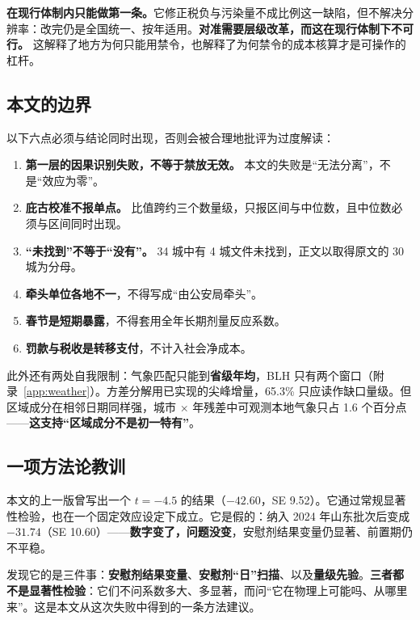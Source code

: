 \textbf{在现行体制内只能做第一条。}它修正税负与污染量不成比例这一缺陷，但不解决分辨率：改完仍是全国统一、按年适用。\textbf{对准需要层级改革，而这在现行体制下不可行。} 这解释了地方为何只能用禁令，也解释了为何禁令的成本核算才是可操作的杠杆。

\subsection{本文的边界}\label{sec:limits}

以下六点必须与结论同时出现，否则会被合理地批评为过度解读：

\begin{enumerate}
  \item \textbf{第一层的因果识别失败，不等于禁放无效。} 本文的失败是“无法分离”，不是“效应为零”。
  \item \textbf{庇古校准不报单点。} 比值跨约三个数量级，只报区间与中位数，且中位数必须与区间同时出现。
  \item \textbf{“未找到”不等于“没有”。} 34 城中有 4 城文件未找到，正文以取得原文的 30 城为分母。
  \item \textbf{牵头单位各地不一}，不得写成“由公安局牵头”。
  \item \textbf{春节是短期暴露}，不得套用全年长期剂量反应系数。
  \item \textbf{罚款与税收是转移支付}，不计入社会净成本。
\end{enumerate}

此外还有两处自我限制：气象匹配只能到\textbf{省级年均}，BLH 只有两个窗口（附录~\ref{app:weather}）。方差分解用已实现的尖峰增量，65.3\% 只应读作缺口量级。但区域成分在相邻日期同样强，城市 $\times$ 年残差中可观测本地气象只占 1.6 个百分点——\textbf{这支持“区域成分不是初一特有”}。

\subsection{一项方法论教训}

本文的上一版曾写出一个 $t=-4.5$ 的结果（$-42.60$，SE 9.52）。它通过常规显著性检验，也在一个固定效应设定下成立。它是假的：纳入 2024 年山东批次后变成 $-31.74$（SE 10.60）——\textbf{数字变了，问题没变}，安慰剂结果变量仍显著、前置期仍不平稳。

发现它的是三件事：\textbf{安慰剂结果变量}、\textbf{安慰剂“日”扫描}、以及\textbf{量级先验}。\textbf{三者都不是显著性检验}：它们不问系数多大、多显著，而问“它在物理上可能吗、从哪里来”。这是本文从这次失败中得到的一条方法建议。
